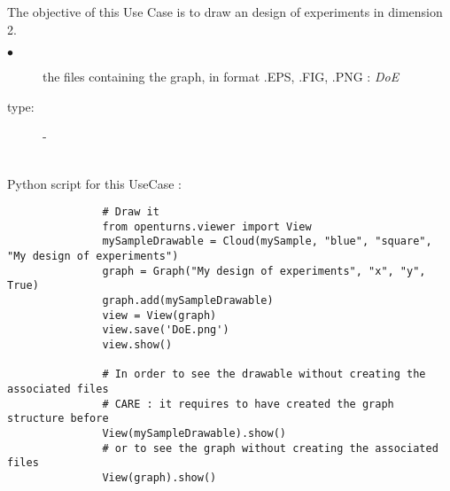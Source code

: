 \renewcommand{\filename}{docUC_MinMax_ExpPlaneDrawing.tex}
\renewcommand{\filetitle}{UC : Drawing an design of experiments  in dimension 2 }

\HeaderIIILevel





The objective of this Use Case is to draw an design of experiments  in dimension 2.\\


             {
               \begin{description}
               \item[$\bullet$] the files containing the graph, in format .EPS, .FIG, .PNG : {\itshape DoE}
               \item[type:] -
               \end{description}
             }

             \textspace\\
             Python script for this UseCase :


             \begin{lstlisting}
               # Draw it
               from openturns.viewer import View
               mySampleDrawable = Cloud(mySample, "blue", "square", "My design of experiments")
               graph = Graph("My design of experiments", "x", "y", True)
               graph.add(mySampleDrawable)
               view = View(graph)
               view.save('DoE.png')
               view.show()

               # In order to see the drawable without creating the associated files
               # CARE : it requires to have created the graph structure before
               View(mySampleDrawable).show()
               # or to see the graph without creating the associated files
               View(graph).show()
             \end{lstlisting}
